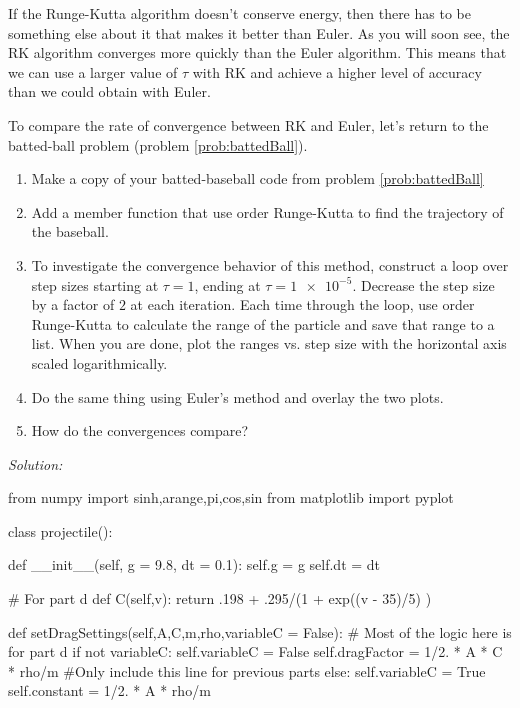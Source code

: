 If the Runge-Kutta algorithm doesn't conserve energy, then there has
to be something else about it that makes it better than Euler.  As you
will soon see, the RK algorithm converges more quickly than the
Euler algorithm.  This means that we can use a larger value of $\tau$
 with RK and achieve a higher level of accuracy than we could obtain
 with Euler.  
\begin{enumerate}
  \probtwo \label{prob:RK2andEuler}To compare the rate of convergence between RK and Euler,
  let's return to the batted-ball problem (problem
  \ref{prob:battedBall}).
\begin{enumerate}
\item Make a copy of your batted-baseball code from problem
  \ref{prob:battedBall}
\item Add a member function that use  order Runge-Kutta to find
  the trajectory of the baseball.
\item To investigate the convergence behavior of this method,
  construct a loop over step sizes starting at $\tau = 1$, ending at
  $\tau = \num{1e-5}$.  Decrease the step size by a factor of $2$ at
each iteration.  Each time through the loop, use  order
Runge-Kutta to calculate the range of the particle and save that range
to a list.  When you are done, plot the ranges vs. step size with the
horizontal axis scaled logarithmically.
\item Do the same thing using Euler's method and overlay the two plots.
\item How do the convergences compare?
\end{enumerate}
\ifsolutions
\textit{Solution:}\\
\begin{codeexample}
\begin{VerbatimOut}{\listingFile}
from numpy import sinh,arange,pi,cos,sin
from matplotlib import pyplot



class projectile():

    def __init__(self, g = 9.8, dt = 0.1):
        self.g = g
        self.dt = dt

        # For part d
    def C(self,v):
        return .198 + .295/(1 + exp((v - 35)/5) )

    def setDragSettings(self,A,C,m,rho,variableC = False):
        # Most of the logic here is for part d
        if not variableC:
            self.variableC = False
            self.dragFactor = 1/2. * A * C * rho/m  #Only include this line for previous parts
        else:
            self.variableC = True
            self.constant = 1/2. * A * rho/m


\end{VerbatimOut}
\end{codeexample}
\end{enumerate}
